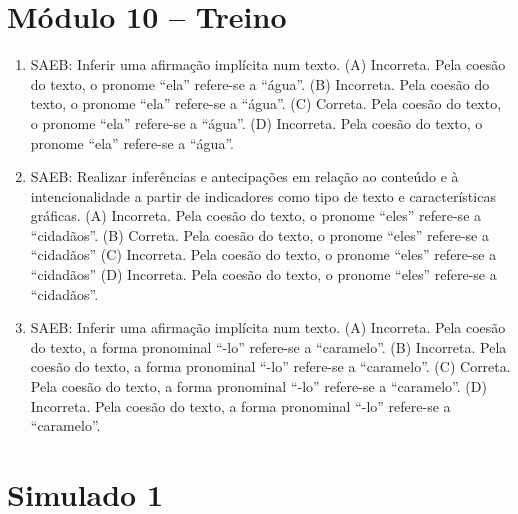 \section*{Módulo 10 – Treino}

\begin{enumerate}
\item
SAEB: Inferir uma afirmação implícita num texto.
(A) Incorreta. Pela coesão do texto, o pronome ``ela'' refere-se a
``água''.
(B) Incorreta. Pela coesão do texto, o pronome ``ela'' refere-se a
``água''.
(C) Correta. Pela coesão do texto, o pronome ``ela'' refere-se a
``água''.
(D) Incorreta. Pela coesão do texto, o pronome ``ela'' refere-se a
``água''.

\item
SAEB: Realizar inferências e antecipações em relação ao conteúdo
e à intencionalidade a partir de indicadores como tipo de texto e
características gráficas.
(A) Incorreta. Pela coesão do texto, o pronome ``eles'' refere-se a
``cidadãos''.
(B) Correta. Pela coesão do texto, o pronome ``eles'' refere-se a
``cidadãos''
(C) Incorreta. Pela coesão do texto, o pronome ``eles'' refere-se a
``cidadãos''
(D) Incorreta. Pela coesão do texto, o pronome ``eles'' refere-se a
``cidadãos''.

\item
SAEB: Inferir uma afirmação implícita num texto.
(A) Incorreta. Pela coesão do texto, a forma pronominal ``-lo'' refere-se a
``caramelo''.
(B) Incorreta. Pela coesão do texto, a forma pronominal ``-lo'' refere-se a
``caramelo''.
(C) Correta. Pela coesão do texto, a forma pronominal ``-lo'' refere-se a
``caramelo''.
(D) Incorreta. Pela coesão do texto, a forma pronominal ``-lo'' refere-se a
``caramelo''.
\end{enumerate}

\section*{Simulado 1}

